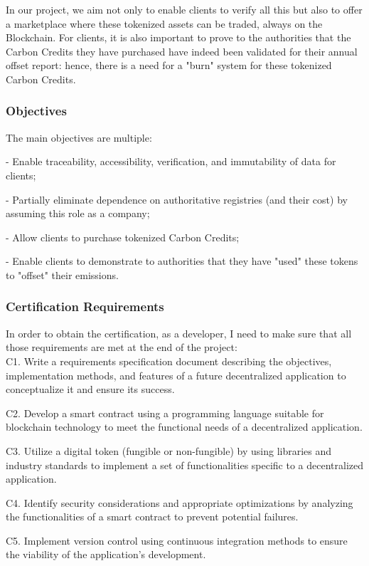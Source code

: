 \documentclass[a4paper, 12pt]{article}
\begin{document}
In our project, we aim not only to enable clients to verify all this but also to offer a marketplace where these tokenized assets can be traded, always on the Blockchain. For clients, it is also important to prove to the authorities that the Carbon Credits they have purchased have indeed been validated for their annual offset report: hence, there is a need for a "burn" system for these tokenized Carbon Credits.

\subsubsection{Objectives}
The main objectives are multiple:

- Enable traceability, accessibility, verification, and immutability of data for clients;

- Partially eliminate dependence on authoritative registries (and their cost) by assuming this role as a company;

- Allow clients to purchase tokenized Carbon Credits;

- Enable clients to demonstrate to authorities that they have "used" these tokens to "offset" their emissions.

\subsubsection{Certification Requirements}
In order to obtain the certification, as a developer, I need to make sure that all those requirements are met at the end of the project:\\

C1. Write a requirements specification document describing the objectives, implementation methods, and features of a future decentralized application to conceptualize it and ensure its success.

C2. Develop a smart contract using a programming language suitable for blockchain technology to meet the functional needs of a decentralized application.

C3. Utilize a digital token (fungible or non-fungible) by using libraries and industry standards to implement a set of functionalities specific to a decentralized application.

C4. Identify security considerations and appropriate optimizations by analyzing the functionalities of a smart contract to prevent potential failures.

C5. Implement version control using continuous integration methods to ensure the viability of the application's development.
\end{document}

